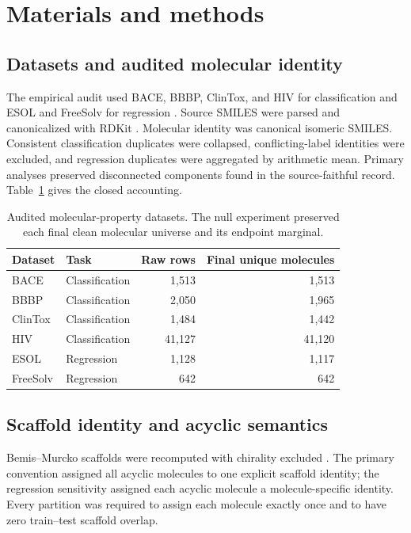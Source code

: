 \section{Materials and methods}

\subsection{Datasets and audited molecular identity}

The empirical audit used BACE, BBBP, ClinTox, and HIV for classification and ESOL and FreeSolv for regression \citep{wu2018moleculenet}. Source SMILES were parsed and canonicalized with RDKit \citep{rdkit2026}. Molecular identity was canonical isomeric SMILES. Consistent classification duplicates were collapsed, conflicting-label identities were excluded, and regression duplicates were aggregated by arithmetic mean. Primary analyses preserved disconnected components found in the source-faithful record. Table~\ref{tab:datasets} gives the closed accounting.

\begin{table}[!htbp]
\centering
\caption{Audited molecular-property datasets. The null experiment preserved each final clean molecular universe and its endpoint marginal.}
\label{tab:datasets}
\begin{tabular}{llrr}
\toprule
Dataset & Task & Raw rows & Final unique molecules \\
\midrule
BACE & Classification & 1,513 & 1,513 \\
BBBP & Classification & 2,050 & 1,965 \\
ClinTox & Classification & 1,484 & 1,442 \\
HIV & Classification & 41,127 & 41,120 \\
ESOL & Regression & 1,128 & 1,117 \\
FreeSolv & Regression & 642 & 642 \\
\bottomrule
\end{tabular}
\end{table}

\subsection{Scaffold identity and acyclic semantics}

Bemis--Murcko scaffolds were recomputed with chirality excluded \citep{bemis1996properties}. The primary convention assigned all acyclic molecules to one explicit scaffold identity; the regression sensitivity assigned each acyclic molecule a molecule-specific identity. Every partition was required to assign each molecule exactly once and to have zero train--test scaffold overlap.

